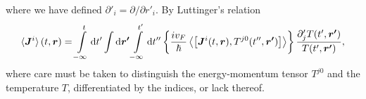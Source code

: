 where we have defined \( \partial'_i = \partial /\partial r'_i \).
By Luttinger's relation
\begin{equation}\label{eq:current-luttinger-final}
  \braket{\bm{J}^i}(t, \bm{r}) =
  \int\limits_{-\infty}^t \mathrm{d}t'
  \int \mathrm{d} \bm{r'}
  \int\limits_{-\infty }^{t'} \mathrm{d}t''
  \left\{
    \frac{i v_{F}}{\hbar} \Braket{\left[
        \bm{J}^i(t, \bm{r}), T^{j0}(t'', \bm{r'})
      \right]}
  \right\} 
  \frac{
    \partial'_j T (t', \bm{r'})}{
    T(t', \bm{r'})
  },
\end{equation}
where care must be taken to distinguish the energy-momentum tensor $T^{j0}$ and the temperature $T$, differentiated by the indices, or lack thereof.



